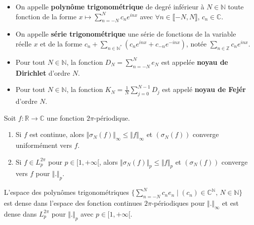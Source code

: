   \begin{definition}
    \begin{itemize}
      \item On appelle \textbf{polynôme trigonométrique} de degré inférieur à $N \in \mathbb{N}$ toute fonction de la forme $x \mapsto \sum_{n=-N}^{N} c_n e^{inx}$ avec $\forall n \in \llbracket -N, N \rrbracket$, $c_n \in \mathbb{C}$.
      \item On appelle \textbf{série trigonométrique} une série de fonctions de la variable réelle $x$ et de la forme $c_n + \sum_{n \in \mathbb{N}^*} (c_n e^{inx} + c_{-n} e^{-inx})$, notée $\sum_{n \in \mathbb{Z}} c_n e^{inx}$.
    \end{itemize}
  \end{definition}


  \begin{example}
    \begin{itemize}
      \item Pour tout $N \in \mathbb{N}$, la fonction $D_N = \sum_{n=-N}^{N} e_N$ est appelée \textbf{noyau de Dirichlet} d'ordre $N$.
      \item Pour tout $N \in \mathbb{N}$, la fonction $K_N = \frac{1}{N} \sum_{j=0}^{N-1} D_j$ est appelé \textbf{noyau de Fejér} d'ordre $N$.
    \end{itemize}
  \end{example}


  \begin{theorem}[Fejér]
    Soit $f : \mathbb{R} \rightarrow \mathbb{C}$ une fonction $2\pi$-périodique.
    \begin{enumerate}[label=(\roman*)]
      \item Si $f$ est continue, alors $\Vert \sigma_N(f) \Vert_\infty \leq \Vert f \Vert_\infty$ et $(\sigma_N(f))$ converge uniformément vers $f$.
      \item Si $f \in L_p^{2\pi}$ pour $p \in [1,+\infty[$, alors $\Vert \sigma_N(f) \Vert_p \leq \Vert f \Vert_p$ et $(\sigma_N(f))$ converge vers $f$ pour $\Vert . \Vert_p$.
    \end{enumerate}
  \end{theorem}

  \begin{corollary}
    L'espace des polynômes trigonométriques $\{ \sum_{n=-N}^N c_n e_n \mid (c_n) \in \mathbb{C}^{\mathbb{N}}, \, N \in \mathbb{N} \}$ est dense dans l'espace des fonction continues $2\pi$-périodiques pour $\Vert . \Vert_\infty$ et est dense dans $L_p^{2\pi}$ pour $\Vert . \Vert_p$ avec $p \in [1,+\infty[$.
  \end{corollary}


